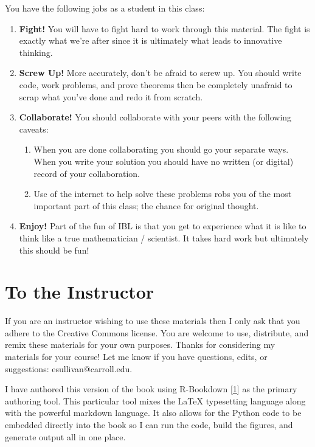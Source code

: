 \documentclass[
]{book}
\providecommand{\tightlist}{%
  \setlength{\itemsep}{0pt}\setlength{\parskip}{0pt}}
\theoremstyle{definition}
\theoremstyle{definition}
\theoremstyle{definition}
\theoremstyle{remark}
\begin{document}
You have the following jobs as a student in this class:

\begin{enumerate}
\def\labelenumi{\arabic{enumi}.}
\tightlist
\item
  \textbf{Fight!} You will have to fight hard to work through this
  material. The fight is exactly what we're after since it is
  ultimately what leads to innovative thinking.
\item
  \textbf{Screw Up!} More accurately, don't be afraid to screw up. You
  should write code, work problems, and prove theorems then be
  completely unafraid to scrap what you've done and redo it from
  scratch.
\item
  \textbf{Collaborate!} You should collaborate with your peers with the
  following caveats:

  \begin{enumerate}
  \def\labelenumii{\arabic{enumii}.}
  \tightlist
  \item
    When you are done collaborating you should go your separate
    ways. When you write your solution you should have no written
    (or digital) record of your collaboration.
  \item
    Use of the internet to help solve these problems robs you of
    the most important part of this class; the chance for original
    thought.
  \end{enumerate}
\item
  \textbf{Enjoy!} Part of the fun of IBL is that you get to experience what
  it is like to think like a true mathematician / scientist. It takes
  hard work but ultimately this should be fun!
\end{enumerate}

\hypertarget{to-the-instructor}{%
\section*{To the Instructor}\label{to-the-instructor}}

If you are an instructor wishing to use these materials then I only ask
that you adhere to the Creative Commons license. You are welcome to use,
distribute, and remix these materials for your own purposes. Thanks for
considering my materials for your course! Let me know if you have
questions, edits, or suggestions: esullivan@carroll.edu.

I have authored this version of the book using R-Bookdown {[}\protect\hyperlink{ref-R-bookdown}{1}{]} as the primary authoring tool. This particular tool mixes the LaTeX typesetting language along with the powerful markdown language. It also allows for the Python code to be embedded directly into the book so I can run the code, build the figures, and generate output all in one place.
\end{document}
